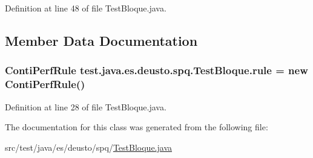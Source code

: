 Definition at line 48 of file Test\+Bloque.\+java.



\subsection{Member Data Documentation}
\subsubsection[{\texorpdfstring{rule}{rule}}]{\setlength{\rightskip}{0pt plus 5cm}Conti\+Perf\+Rule test.\+java.\+es.\+deusto.\+spq.\+Test\+Bloque.\+rule = new Conti\+Perf\+Rule()}\hypertarget{classtest_1_1java_1_1es_1_1deusto_1_1spq_1_1_test_bloque_a16e61375484212082690ea20320b4546}{}\label{classtest_1_1java_1_1es_1_1deusto_1_1spq_1_1_test_bloque_a16e61375484212082690ea20320b4546}


Definition at line 28 of file Test\+Bloque.\+java.



The documentation for this class was generated from the following file\+:\begin{DoxyCompactItemize}
\item 
src/test/java/es/deusto/spq/\hyperlink{_test_bloque_8java}{Test\+Bloque.\+java}\end{DoxyCompactItemize}
